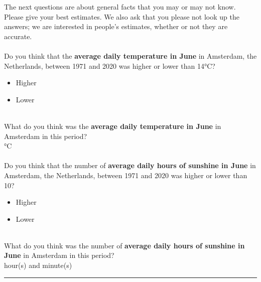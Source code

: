 \noindent The next questions are about general facts that you may or may not know.
Please give your best estimates.
We also ask that you please not look up the answers; we are interested in people's estimates, whether or not they are accurate.\\
\\
Do you think that the \textbf{average daily temperature in June} in Amsterdam, the Netherlands, between 1971 and 2020 was higher or lower than 14°C?
\begin{itemize}
\item Higher
\item Lower
\end{itemize}
\leavevmode \\
\noindent What do you think was the \textbf{average daily temperature in June} in Amsterdam in this period?\\
\framebox[0.1\textwidth]{\rule{0pt}{15pt}}°C\\
\\
\noindent Do you think that the number of \textbf{average daily hours of sunshine in June} in Amsterdam, the Netherlands, between 1971 and 2020 was higher or lower than 10?
\begin{itemize}
\item Higher
\item Lower
\end{itemize}
\leavevmode \\
\noindent What do you think was the number of \textbf{average daily hours of sunshine in June} in Amsterdam in this period?\\
\framebox[0.1\textwidth]{\rule{0pt}{15pt}} hour(s) and \framebox[0.1\textwidth]{\rule{0pt}{15pt}} minute(s)

\bigskip
\noindent \rule{\linewidth}{0.4pt}

